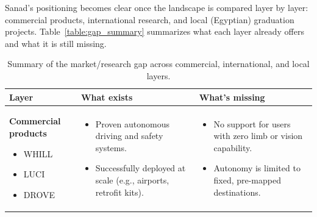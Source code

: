 Sanad's positioning becomes clear once the landscape is compared layer by layer: commercial products, international research, and local (Egyptian) graduation projects. Table~\ref{table:gap_summary} summarizes what each layer already offers and what it is still missing.
\begin{table}[H]
\centering
\caption{Summary of the market/research gap across commercial, international, and local layers.}
\label{tab:market_gap}

\begin{tabular}{|>{\raggedright\arraybackslash}p{2.8cm}|
                >{\raggedright\arraybackslash}p{5.4cm}|
                >{\raggedright\arraybackslash}p{5.4cm}|}
\hline
\textbf{Layer} & \textbf{What exists} & \textbf{What's missing} \\
\hline

\textbf{Commercial products}
\begin{itemize}[leftmargin=*,nosep]
    \item WHILL
    \item LUCI
    \item DROVE
\end{itemize}
&
\begin{itemize}[leftmargin=*,nosep]
    \item Proven autonomous driving and safety systems.
    \item Successfully deployed at scale (e.g., airports, retrofit kits).
\end{itemize}
&
\begin{itemize}[leftmargin=*,nosep]
    \item No support for users with zero limb or vision capability.
    \item Autonomy is limited to fixed, pre-mapped destinations.
\end{itemize}
\\
\hline


\end{tabular}
\end{table}
